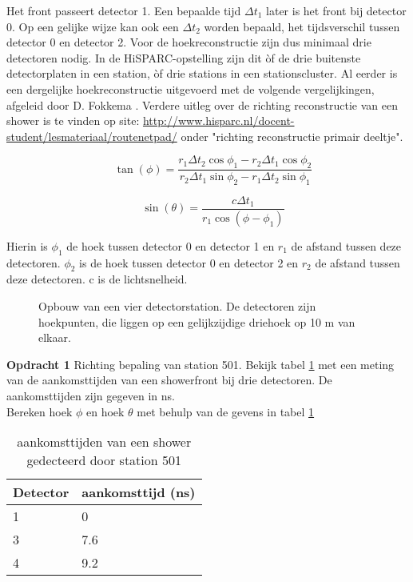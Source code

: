Het front passeert detector 1. Een bepaalde tijd $\Delta t_{1}$ later is het front bij detector 0. Op een gelijke wijze kan ook een $\Delta t_{2}$ worden bepaald, het tijdsverschil tussen detector 0 en detector 2. Voor de hoekreconstructie zijn dus minimaal drie detectoren nodig. In de HiSPARC-opstelling zijn dit òf de drie buitenste detectorplaten in een station, òf drie stations in een stationscluster. Al eerder is een dergelijke hoekreconstructie uitgevoerd met de volgende vergelijkingen, afgeleid door D. Fokkema \cite{Fokkema}.
Verdere uitleg over de richting reconstructie van een shower is te vinden op site:
 \url{http://www.hisparc.nl/docent-student/lesmateriaal/routenetpad/} onder "richting reconstructie primair deeltje".


\begin{equation}
	   \quad \tan(\phi)= \frac{r_1\Delta t_2\cos\phi_1-r_2\Delta t_1\cos \phi_2}{r_2\Delta t_1\sin\phi_2-r_1\Delta t_2\sin \phi_1}
\end{equation}

\begin{equation}
	    \quad \sin(\theta)= \frac{c\Delta t_1}{r_1\cos(\phi-\phi_1)}
\end{equation}

Hierin is $\phi_{1}$ de hoek tussen detector 0 en detector 1 en $r_{1}$ de afstand tussen deze detectoren. $\phi_{2}$ is de hoek tussen detector 0 en detector 2 en $r_{2}$ de afstand tussen deze detectoren. c is de lichtsnelheid.



\begin{figure}
    \centering
    
    \caption{Opbouw van een vier detectorstation. De detectoren zijn hoekpunten, die  liggen op een gelijkzijdige driehoek op 10 m van elkaar.}
    \label{fig:stationlayout} 
\end{figure}


\textbf{Opdracht 1} Richting bepaling van station 501.
Bekijk tabel  \ref{tab:arrival} met een meting van de aankomsttijden van een showerfront bij drie detectoren.
De aankomsttijden zijn gegeven in ns. \\
Bereken hoek $\phi$ en hoek $\theta$ met behulp van de gevens in tabel \ref{tab:arrival}


\begin{table}
\begin{center}    
\begin{tabular}{ |l |l  |}    
\hline
    Detector & aankomsttijd (ns)  \\ 
\hline
    1 & 0 \\
 \hline
    3 & 7.6  \\
 \hline
    4 & 9.2 \\ 
\hline
\end{tabular}
    \caption{ aankomsttijden van een shower gedecteerd door station 501}
 \label{tab:arrival}     
\end{center} 
\end{table}


